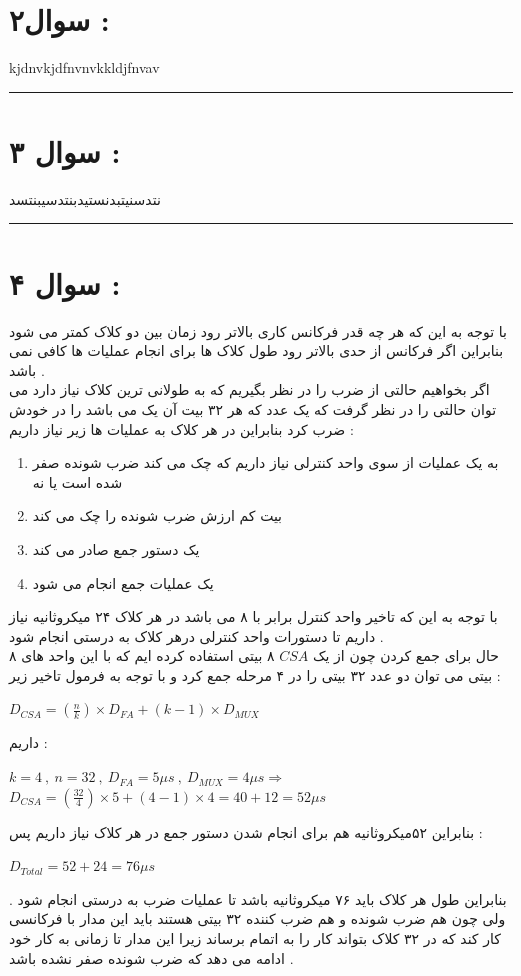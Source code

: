 \documentclass{article}
\begin{document}
\section*{سوال۲ : }
kjdnvkjdfnvnvkkldjfnvav
\hrule
\section*{سوال ۳ : }
نتدسنیتبدنستیدبنتدسیبنتسد
\hrule
\section*{سوال ۴ : }
با توجه به این که هر چه قدر فرکانس کاری بالاتر رود زمان بین دو کلاک کمتر می شود بنابراین اگر فرکانس از حدی بالاتر رود طول کلاک ها برای انجام عملیات ها کافی نمی باشد  . \\
اگر بخواهیم حالتی از ضرب را در نظر بگیریم که به طولانی ترین کلاک نیاز دارد می توان حالتی را در نظر گرفت که یک عدد که هر ۳۲ بیت آن یک می باشد را در خودش ضرب کرد بنابراین در هر کلاک به عملیات ها زیر نیاز داریم  :‌
\begin{center}
	\begin{enumerate}
		\item به یک عملیات از سوی واحد کنترلی نیاز داریم که چک می کند ضرب شونده صفر شده است یا نه 
		\item بیت کم ارزش ضرب شونده را چک می کند 
		\item یک دستور جمع صادر می کند 
		\item یک عملیات جمع انجام می شود  
	\end{enumerate}
\end{center}
با توجه به این که تاخیر واحد کنترل برابر با ۸ می باشد در هر کلاک ۲۴ میکروثانیه نیاز داریم تا دستورات واحد کنترلی درهر کلاک به درستی انجام شود . \\
حال برای جمع کردن چون از یک 
$CSA$
۸ بیتی استفاده کرده ایم که با این واحد های ۸ بیتی می توان دو عدد ۳۲ بیتی را در ۴ مرحله جمع کرد و با توجه به فرمول  تاخیر زیر  : 
\begin{center}
	$ D_{CSA} = (\frac{n}{k}) \times D_{FA} + (k-1)\times D_{MUX}$
\end{center}
داریم  :  
\begin{center}
	$ k =  4 \  , \ n = 32 \ , \ D_{FA} = 5 \mu s \ , \ D_{MUX} = 4 \mu s \Rightarrow$\\
	$D_{CSA} = (\frac{32}{4})\times 5 + (4-1)\times 4  = 40 + 12 = 52 \mu s$
\end{center}

بنابراین ۵۲میکروثانیه هم برای انجام شدن دستور جمع در هر کلاک نیاز داریم پس  : 
\begin{center}
	$D_{Total} = 52 + 24 = 76 \mu s $
\end{center}
بنابراین طول هر کلاک باید ۷۶ میکروثانیه باشد تا  عملیات ضرب به درستی  انجام شود . ولی چون هم ضرب شونده و هم ضرب کننده ۳۲ بیتی هستند باید این مدار با فرکانسی کار کند که در ۳۲ کلاک بتواند کار را به اتمام برساند زیرا این مدار تا زمانی به کار خود ادامه می دهد که ضرب شونده صفر نشده باشد . \\
\end{document}
